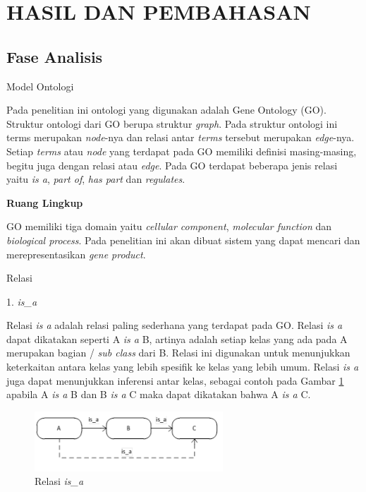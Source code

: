\section*{HASIL DAN PEMBAHASAN}
\subsection*{Fase Analisis}
\begin{flushleft}
Model Ontologi
\end{flushleft}
Pada penelitian ini ontologi yang digunakan adalah Gene Ontology (GO).  Struktur ontologi dari GO berupa struktur \textit{graph}. Pada struktur ontologi ini terms merupakan \textit{node}-nya dan relasi antar \textit{terms} tersebut merupakan \textit{edge}-nya. Setiap \textit{terms} atau \textit{node} yang terdapat pada GO memiliki definisi masing-masing, begitu juga dengan relasi atau \textit{edge}. Pada GO terdapat beberapa jenis relasi yaitu \textit{is a}, \textit{part of}, \textit{has part} dan \textit{regulates}.
\begin{flushleft}
\textbf{Ruang Lingkup}
\end{flushleft}
GO memiliki tiga domain yaitu \textit{cellular component}, \textit{molecular function} dan \textit{biological process}. Pada penelitian ini akan dibuat sistem yang dapat mencari dan merepresentasikan \textit{gene product}.
\begin{flushleft}
Relasi\par
1. \textit{is\_a}
\end{flushleft}\par
Relasi \textit{is a} adalah relasi paling sederhana yang terdapat pada GO. Relasi \textit{is a} dapat dikatakan seperti A \textit{is a} B, artinya adalah setiap kelas yang ada pada A merupakan bagian / \textit{sub class} dari B. Relasi ini digunakan untuk menunjukkan keterkaitan antara kelas yang lebih spesifik ke kelas yang lebih umum. Relasi \textit{is a} juga dapat menunjukkan inferensi antar kelas, sebagai contoh pada Gambar \ref{fig:is_a}  apabila A \textit{is a} B dan B \textit{is a} C maka dapat dikatakan bahwa A \textit{is a} C.

\begin{figure}[h!] %
	\centering
	\includegraphics[width=200pt]{isa.png}
	\caption{Relasi \textit{is\_a}}
	\label{fig:is_a}
\end{figure}

